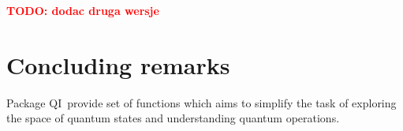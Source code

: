 \documentclass[final,5p,times,twocolumn]{elsarticle}
\newcommand{\1}{{\rm 1\hspace{-0.9mm}l}}
\newcommand{\qi}{QI}
\newcommand{\todo}[1]{\textcolor{red}{\bf TODO: #1}}
\begin{document}
\todo{dodac druga wersje}

\section{Concluding remarks}\label{sec:comclude}
Package \qi\ provide set of functions which aims to simplify the task of
exploring the space of quantum states and understanding quantum operations.
  
  


\end{document}
